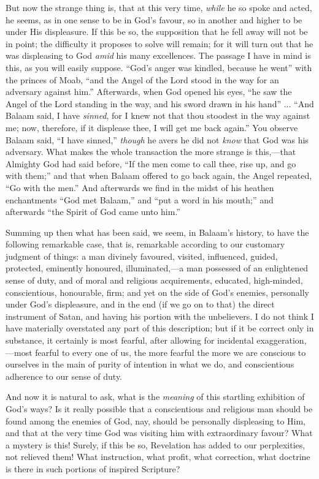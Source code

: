But now the strange thing is, that at this very time, \emph{while}
he so spoke and acted, he seems, as in one sense to be in God's favour,
so in another and higher to be under His displeasure. If this be so,
the supposition that he fell away will not be in point; the difficulty
it proposes to solve will remain; for it will turn out that he was
displeasing to God \emph{amid} his many excellences. The passage I
have in mind is this, as you will easily suppose. ``God's anger
was kindled, because he went'' with the princes of Moab, ``and
the Angel of the Lord stood in the way for an adversary against
him.'' Afterwards, when God opened his eyes, ``he saw the
Angel of the Lord standing in the way, and his sword drawn in his
hand'' ... ``And Balaam said, I have \emph{sinned}, for I knew
not that thou stoodest in the way against me; now, therefore, if it
displease thee, I will get me back again.'' You observe Balaam
said, ``I have sinned,'' \emph{though} he avers he did not \emph{know}
that God was his adversary. What makes the whole transaction the more
strange is this,—that Almighty God had said before, ``If the men
come to call thee, rise up, and go with them;'' and that when Balaam
offered to go back again, the Angel repeated, ``Go with the
men.'' And afterwards we find in the midst of his heathen
enchantments ``God met Balaam,'' and ``put a word in his
mouth;'' and afterwards ``the Spirit of God came unto
him.''

Summing up then what has been said, we seem, in Balaam's history,
to have the following remarkable case, that is, remarkable according
to our customary judgment of things: a man divinely favoured, visited,
influenced, guided, protected, eminently honoured, illuminated,—a
man possessed of an enlightened sense of duty, and of moral and
religious acquirements, educated, high-minded, conscientious,
honourable, firm; and yet on the side of God's enemies, personally
under God's displeasure, and in the end (if we go on to that) the
direct instrument of Satan, and having his portion with the
unbelievers. I do not think I have materially overstated any part of
this description; but if it be correct only in substance, it certainly
is most fearful, after allowing for incidental exaggeration,—most
fearful to every one of us, the more fearful the more we are conscious
to ourselves in the main of purity of intention in what we do, and
conscientious adherence to our sense of duty.

And now it is natural to ask, what is the \emph{meaning} of this
startling exhibition of God's ways? Is it really possible that a
conscientious and religious man should be found among the enemies of
God, nay, should be personally displeasing to Him, and that at the
very time God was visiting him with extraordinary favour? What a
mystery is this! Surely, if this be so, Revelation has added to our
perplexities, not relieved them! What instruction, what profit, what
correction, what doctrine is there in such portions of inspired
Scripture?

